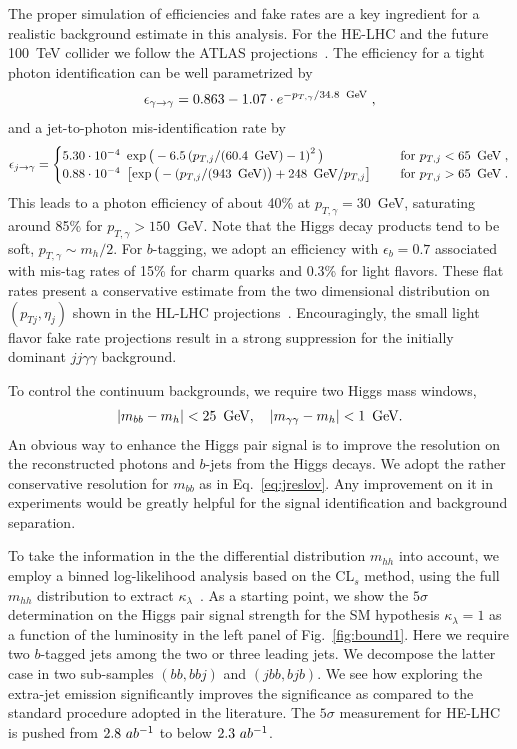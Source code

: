 The proper simulation of efficiencies and fake rates are a key
ingredient for a realistic background estimate in this analysis.  For
the HE-LHC and the future 100~TeV collider we follow the ATLAS
projections~\cite{ATL-PHYS-PUB-2016-026}. The efficiency for a tight photon 
identification can be well parametrized by
%
\begin{align}
\epsilon_{\gamma\to\gamma} = 0.863 - 1.07 \cdot e^{-p_{T,\gamma}/34.8~\GeV}\;,
\end{align}
%
and a jet-to-photon mis-identification rate by
\begin{align}
\epsilon_{j\to\gamma} = 
\begin{cases} 
5.30\cdot 10^{-4}  \ \exp\big( -6.5 \left( p_{T,j}/(60.4~\GeV)- 1 \right)^2 \big) 
\quad &\text{ for } p_{T,j} <65~\GeV \;, \\
0.88 \cdot 10^{-4} \  \left[ \exp \big( -(p_{T,j}/(943~\GeV) \big) +248~\GeV/p_{T,j}\right]
\quad &\text{ for } p_{T,j} >65~\GeV \;.
\end{cases}
\end{align}
%
This leads to a photon efficiency of about 40\% at $p_{T,\gamma}=30$~GeV,
saturating around 85\% for $p_{T,\gamma}>150$~GeV. Note that the 
Higgs decay products tend to be soft, $p_{T,\gamma}\sim m_h/2$. 
For $b$-tagging, we adopt an efficiency with $\epsilon_b =0.7$ associated 
with mis-tag rates of 15\% for charm quarks and 0.3\% for
light flavors. These flat rates present a conservative estimate from
the two dimensional distribution on $(p_{Tj},\eta_j)$ shown in the
HL-LHC projections~\cite{Kling:2016lay}. Encouragingly, the small light
flavor fake rate projections result in a strong suppression for the
initially dominant $jj\gamma\gamma$ background.

To control the continuum backgrounds, we require two Higgs mass windows,
%
\begin{align}
 |m_{bb}-m_h|<25~\,\text{Ge\hspace{-.08em}V}, \quad 
 |m_{\gamma\gamma}-m_h|<1~\,\text{Ge\hspace{-.08em}V}  .
 \label{eq:jreslov}
\end{align}
%
An obvious way to enhance the Higgs pair signal is to improve the
resolution on the reconstructed photons and $b$-jets from the Higgs
decays.  We adopt the rather conservative resolution for $m_{bb}$ as
in Eq.~\eqref{eq:jreslov}. Any improvement on it in experiments would
be greatly helpful for the signal identification and background
separation.  
\medskip

To take the information in the the differential distribution
$m_{hh}$ into account, we employ a binned log-likelihood analysis based on the 
CL$_{s}$ method, using the full $m_{hh}$ distribution to extract 
$\kappa_{\lambda}$~\cite{Read:2002hq}. As a starting point, we show the $5\sigma$ 
determination on the Higgs pair signal strength for the SM hypothesis $\kappa_{\lambda}=1$ as a 
function of the luminosity in the left panel of Fig.~\ref{fig:bound1}. Here 
we require two $b$-tagged jets among the two or three leading jets. We 
decompose the latter case in two  sub-samples $(bb,bbj)$ and $(jbb,bjb)$. 
We see how exploring the extra-jet emission significantly improves the 
significance as compared to the standard procedure adopted in the 
literature. The $5\sigma$ measurement for HE-LHC is pushed from 
$2.8~ab^{-1}$ to below $2.3~ab^{-1}$. 

